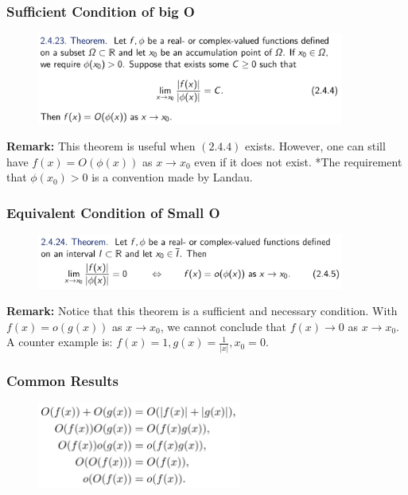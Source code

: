 \documentclass[10pt, t]{beamer}
\begin{document}
\begin{frame}
    \frametitle{Sufficient Condition of big O}

    \begin{figure}[H]
        \centering
        \includegraphics[width=0.9\textwidth]{2020-10-28-00-20-26.png}
    \end{figure}
    \textbf{Remark:} This theorem is useful when $(2.4.4)$ exists. However, one can still have $f(x)=O(\phi(x))$ as $x\to x_0$ even if it does not exist. *The requirement that $\phi(x_0)>0$ is a convention made by Landau.
\end{frame}

\begin{frame}
    \frametitle{Equivalent Condition of Small O}

    \begin{figure}[H]
        \centering
        \includegraphics[width=0.9\textwidth]{2020-10-28-01-02-50.png}
    \end{figure}
    \textbf{Remark:} Notice that this theorem is a sufficient and necessary condition. With $f(x)=o(g(x))$ as $x\to x_0$, we cannot conclude that $f(x)\to 0$ as $x\to x_0$. A counter example is: $f(x)=1,g(x)=\frac{1}{|x|},x_0=0$.
\end{frame}

\begin{frame}
    \frametitle{Common Results}

    \begin{figure}[H]
        \centering
        \includegraphics[width=0.6\textwidth]{2020-10-28-09-52-45.png}
    \end{figure}
\end{frame}
\end{document}
